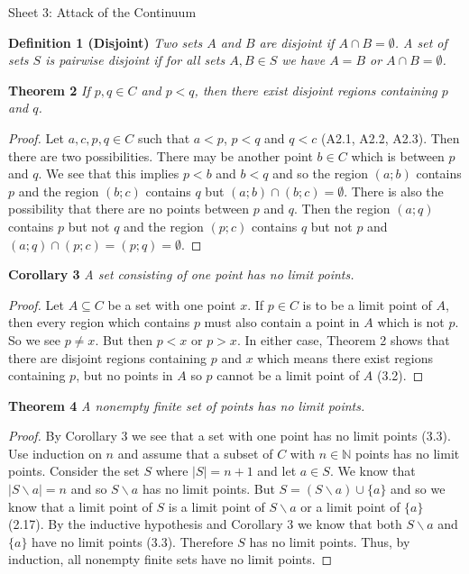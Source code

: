 \documentclass{article}
\begin{document}
\begin{flushleft}

\Large

Sheet 3: Attack of the Continuum\newline

\normalsize

\textbf{Definition 1 (Disjoint)}
\textsl{Two sets $A$ and $B$ are disjoint if $A \cap B = \emptyset$. A set of sets $S$ is pairwise disjoint if for all sets $A,B \in S$ we have $A=B$ or $A \cap B = \emptyset$.}\newline

\textbf{Theorem 2}
\textsl{If $p,q \in C$ and $p<q$, then there exist disjoint regions containing $p$ and $q$.}
\begin{proof}
Let $a,c,p,q \in C$ such that $a<p$, $p<q$ and $q<c$ (A2.1, A2.2, A2.3). Then there are two possibilities. There may be another point $b \in C$ which is between $p$ and $q$. We see that this implies $p<b$ and $b<q$ and so the region $(a;b)$ contains $p$ and the region $(b;c)$ contains $q$ but $(a;b) \cap (b;c) = \emptyset$. There is also the possibility that there are no points between $p$ and $q$. Then the region $(a;q)$ contains $p$ but not $q$ and the region $(p;c)$ contains $q$ but not $p$ and $(a;q) \cap (p;c) = (p;q) = \emptyset$.
\end{proof}

\textbf{Corollary 3}
\textsl{A set consisting of one point has no limit points.}
\begin{proof}
Let $A \subseteq C$ be a set with one point $x$. If $p \in C$ is to be a limit point of $A$, then every region which contains $p$ must also contain a point in $A$ which is not $p$. So we see $p \neq x$. But then $p<x$ or $p>x$. In either case, Theorem 2 shows that there are disjoint regions containing $p$ and $x$ which means there exist regions containing $p$, but no points in $A$ so $p$ cannot be a limit point of $A$ (3.2).
\end{proof}

\textbf{Theorem 4}
\textsl{A nonempty finite set of points has no limit points.}
\begin{proof}
By Corollary 3 we see that a set with one point has no limit points (3.3). Use induction on $n$ and assume that a subset of $C$ with $n \in \mathbb{N}$ points has no limit points. Consider the set $S$ where $|S| = n+1$ and let $a \in S$. We know that $|S \backslash a| = n$ and so $S \backslash a$ has no limit points. But $S = (S \backslash a) \cup \{a\}$ and so we know that a limit point of $S$ is a limit point of $S \backslash a$ or a limit point of $\{a\}$ (2.17). By the inductive hypothesis and Corollary 3 we know that both $S \backslash a$ and $\{a\}$ have no limit points (3.3). Therefore $S$ has no limit points. Thus, by induction, all nonempty finite sets have no limit points.
\end{proof}


\end{flushleft}
\end{document}
